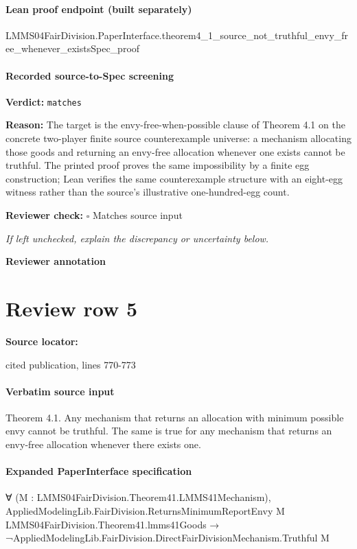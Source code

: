 \documentclass[10pt]{article}
\newcommand{\reviewerbox}{%
  \par\noindent\fbox{\parbox{0.96\linewidth}{\rule{0pt}{0.38in}}}\par
}
\newcommand{\reviewmatch}[1]{%
  \par\noindent\textbf{Reviewer check:} $\square$\; #1\par
  \noindent\emph{If left unchecked, explain the discrepancy or uncertainty below.}\par
}
\begin{document}
\paragraph{Lean proof endpoint (built separately)}\begin{ReviewVerbatim}
LMMS04FairDivision.PaperInterface.theorem4_1_source_not_truthful_envy_free_whenever_existsSpec_proof
\end{ReviewVerbatim}

\paragraph{Recorded source-to-Spec screening}
\textbf{Verdict:} \texttt{matches}
\\
{\raggedright
\textbf{Reason:} The target is the envy-\allowbreak{}free-\allowbreak{}when-\allowbreak{}possible clause of Theorem 4.\allowbreak{}1 on the concrete two-\allowbreak{}player finite source counterexample universe:\allowbreak{} a mechanism allocating those goods and returning an envy-\allowbreak{}free allocation whenever one exists cannot be truthful.\allowbreak{} The printed proof proves the same impossibility by a finite egg construction;\allowbreak{} Lean verifies the same counterexample structure with an eight-\allowbreak{}egg witness rather than the source's illustrative one-\allowbreak{}hundred-\allowbreak{}egg count.\allowbreak{}
\par}
\reviewmatch{Matches source input}
\noindent\textbf{Reviewer annotation}\par
\reviewerbox
\clearpage
\hypertarget{source-claim-b1ad798761a4903c}{}
\section*{Review row 5}
\textbf{Source locator:} {\footnotesize\raggedright cited publication, lines 770-\allowbreak{}773\par}
\paragraph{Verbatim source input}
\begin{ReviewVerbatim}
Theorem 4.1. Any mechanism that returns an allocation
with minimum possible envy cannot be truthful. The same is
true for any mechanism that returns an envy-free allocation
whenever there exists one.
\end{ReviewVerbatim}



\paragraph{Expanded PaperInterface specification}
\begin{ReviewVerbatim}
∀ (M : LMMS04FairDivision.Theorem41.LMMS41Mechanism),
  AppliedModelingLib.FairDivision.ReturnsMinimumReportEnvy M LMMS04FairDivision.Theorem41.lmms41Goods →
    ¬AppliedModelingLib.FairDivision.DirectFairDivisionMechanism.Truthful M
\end{ReviewVerbatim}
\end{document}
